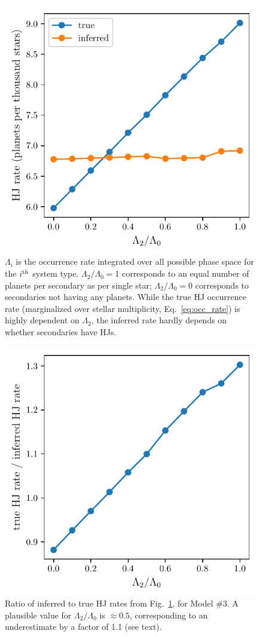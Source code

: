 \begin{figure}[!tb]
    \centering
    \includegraphics[width=.6\textwidth]{figures/HJ_correction_inputrate_vs_HJratevalues.pdf}
    \caption{
    $\Lambda_i$ is the occurrence rate integrated over all possible phase 
    space for the $i^{\rm th}$ system type. $\Lambda_2/\Lambda_0=1$ 
    corresponds to an equal number of planets per secondary as per single star;
    $\Lambda_2/\Lambda_0=0$ corresponds to secondaries not having any planets.
    While the true HJ occurrence rate (marginalized over stellar multiplicity, 
    Eq.~\ref{eq:occ_rate}) is highly dependent on $\Lambda_2$, 
    the inferred rate hardly depends on whether secondaries have HJs.
    }
    \label{fig:HJ_correction_inputrate_vs_HJratevalues}
\end{figure}

\begin{figure}[!tb]
    \centering
    \includegraphics[width=.6\textwidth]{figures/HJ_correction_inputrate_vs_HJrate_correction_factor.pdf}
    \caption{
    Ratio of inferred to true HJ rates from 
    Fig.~\ref{fig:HJ_correction_inputrate_vs_HJratevalues}, for Model \#3.
    A plausible value for $\Lambda_2/\Lambda_0$ is $\approx 0.5$, 
    corresponding to an underestimate by a factor of 1.1 (see text).
    }
    \label{fig:HJ_correction_inputrate_vs_HJrate_correction_factor}
\end{figure}

